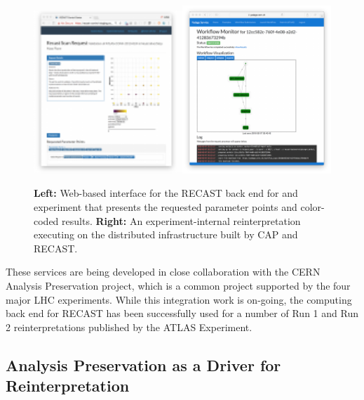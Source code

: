 \begin{figure}[t]
\begin{center}
\includegraphics[width=0.5\textwidth,angle=0]{ch5-figures/requestview.pdf}\includegraphics[width=0.5\textwidth,angle=0]{ch5-figures/monitor.pdf}

\end{center}
\caption{
{\bf Left:} Web-based interface for the RECAST back end for and experiment that presents the requested parameter points and color-coded results.
{\bf Right:} An experiment-internal reinterpretation executing on the distributed infrastructure built by CAP and RECAST.}
\label{fig:recast-cc}
\end{figure}

These services are being developed in close collaboration with the CERN Analysis Preservation project, which is a common project supported by the four major LHC experiments. While this integration work is on-going, the computing back end for RECAST has been successfully used for a number of Run 1 and Run 2 reinterpretations published by the ATLAS Experiment.

\subsection{Analysis Preservation as a Driver for Reinterpretation}

